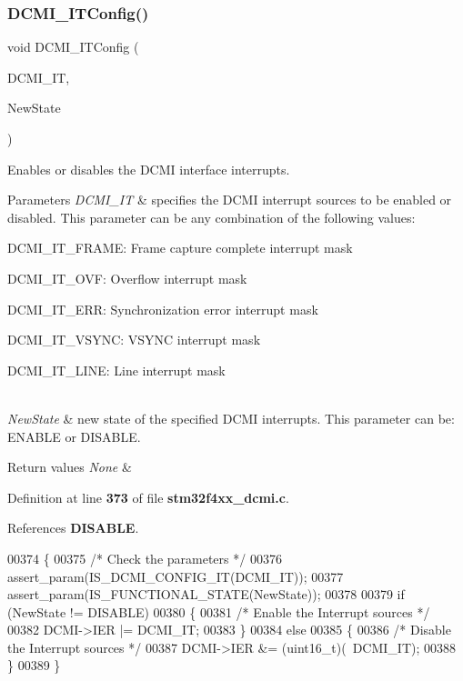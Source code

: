 \subsubsection{D\+C\+M\+I\+\_\+\+I\+T\+Config()}
{\footnotesize\ttfamily void D\+C\+M\+I\+\_\+\+I\+T\+Config (\begin{DoxyParamCaption}\item[{uint16\+\_\+t}]{D\+C\+M\+I\+\_\+\+IT,  }\item[{\textbf{ Functional\+State}}]{New\+State }\end{DoxyParamCaption})}



Enables or disables the D\+C\+MI interface interrupts. 


\begin{DoxyParams}{Parameters}
{\em D\+C\+M\+I\+\_\+\+IT} & specifies the D\+C\+MI interrupt sources to be enabled or disabled. This parameter can be any combination of the following values\+: \begin{DoxyItemize}
\item D\+C\+M\+I\+\_\+\+I\+T\+\_\+\+F\+R\+A\+ME\+: Frame capture complete interrupt mask \item D\+C\+M\+I\+\_\+\+I\+T\+\_\+\+O\+VF\+: Overflow interrupt mask \item D\+C\+M\+I\+\_\+\+I\+T\+\_\+\+E\+RR\+: Synchronization error interrupt mask \item D\+C\+M\+I\+\_\+\+I\+T\+\_\+\+V\+S\+Y\+NC\+: V\+S\+Y\+NC interrupt mask \item D\+C\+M\+I\+\_\+\+I\+T\+\_\+\+L\+I\+NE\+: Line interrupt mask \end{DoxyItemize}
\\
\hline
{\em New\+State} & new state of the specified D\+C\+MI interrupts. This parameter can be\+: E\+N\+A\+B\+LE or D\+I\+S\+A\+B\+LE. \\
\hline
\end{DoxyParams}

\begin{DoxyRetVals}{Return values}
{\em None} & \\
\hline
\end{DoxyRetVals}


Definition at line \textbf{ 373} of file \textbf{ stm32f4xx\+\_\+dcmi.\+c}.



References \textbf{ D\+I\+S\+A\+B\+LE}.


\begin{DoxyCode}
00374 \{
00375   \textcolor{comment}{/* Check the parameters */}
00376   assert_param(IS_DCMI_CONFIG_IT(DCMI\_IT));
00377   assert_param(IS_FUNCTIONAL_STATE(NewState));
00378   
00379   \textcolor{keywordflow}{if} (NewState != DISABLE)
00380   \{
00381     \textcolor{comment}{/* Enable the Interrupt sources */}
00382     DCMI->IER |= DCMI\_IT;
00383   \}
00384   \textcolor{keywordflow}{else}
00385   \{
00386     \textcolor{comment}{/* Disable the Interrupt sources */}
00387     DCMI->IER &= (uint16\_t)(~DCMI\_IT);
00388   \}  
00389 \}
\end{DoxyCode}
